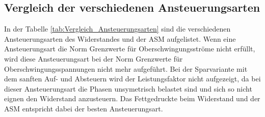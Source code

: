 \newpage
\subsection{Vergleich der verschiedenen Ansteuerungsarten}
In der Tabelle \ref{tab:Vergleich_Ansteuerungsarten} sind die verschiedenen Ansteuerungsarten des Widerstandes und der ASM aufgelistet. Wenn eine Ansteuerungsart die Norm Grenzwerte für Oberschwingungsströme nicht erfüllt, wird diese Ansteuerungsart bei der Norm Grenzwerte für Oberschwingungsspannungen nicht mehr aufgeführt. Bei der Sparvariante mit dem sanften Auf- und Absteuern wird der Leistungsfaktor nicht aufgezeigt, da bei dieser Ansteuerungsart die Phasen unsymetrisch belastet sind und sich so nicht eignen den Widerstand anzusteuern.
Das Fettgedruckte beim Widerstand und der ASM entspricht dabei der besten Ansteuerungsart. 

